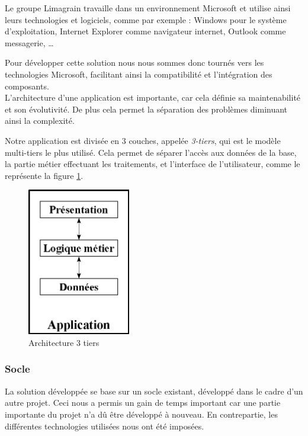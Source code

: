 Le groupe Limagrain travaille dans un environnement Microsoft et utilise ainsi leurs technologies et logiciels, comme par exemple : Windows pour le système d'exploitation, Internet Explorer comme navigateur internet, Outlook comme messagerie, \ldots

Pour développer cette solution nous nous sommes donc tournés vers les technologies Microsoft, facilitant ainsi la compatibilité et l'intégration des composants.
\\

L'architecture d'une application est importante, car cela définie sa maintenabilité et son évolutivité.
De plus cela permet la séparation des problèmes diminuant ainsi la complexité.

Notre application est divisée en 3 couches, appelée \textit{3-tiers}, qui est le modèle multi-tiers le plus utilisé.
Cela permet de séparer l'accès aux données de la base, la partie métier effectuant les traitements, et l'interface de l'utilisateur, comme le représente la figure \ref{architecture_3_tiers}.
\begin{figure}[!h]
	\center
	\includegraphics[width=0.4\textwidth]{img/architecture_3_tiers.png}
	\caption{Architecture 3 tiers}
	\label{architecture_3_tiers}
\end{figure}


\subsubsection{Socle}

La solution développée se base sur un socle existant, développé dans le cadre d'un autre projet.
Ceci nous a permis un gain de temps important car une partie importante du projet n'a dû être développé à nouveau.
En contrepartie, les différentes technologies utilisées nous ont été imposées.


